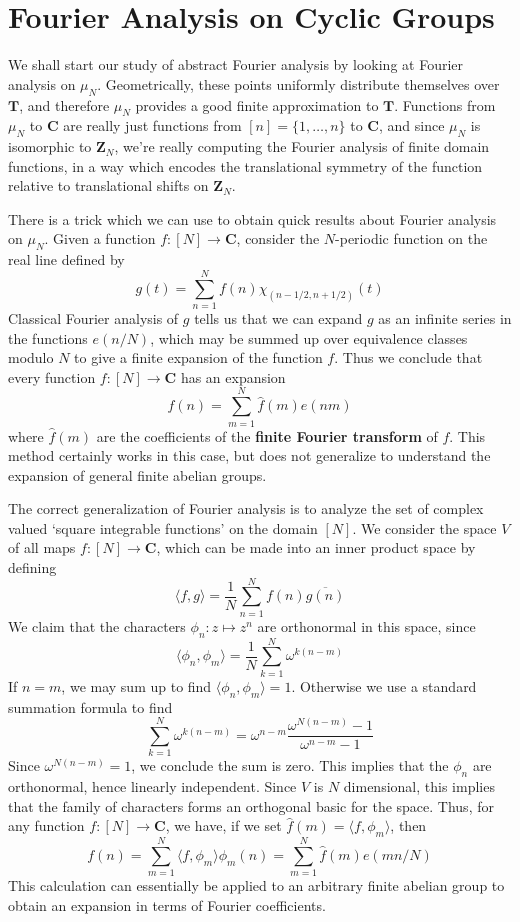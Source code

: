 \section{Fourier Analysis on Cyclic Groups}

We shall start our study of abstract Fourier analysis by looking at Fourier analysis on $\mu_N$. Geometrically, these points uniformly distribute themselves over $\mathbf{T}$, and therefore $\mu_N$ provides a good finite approximation to $\mathbf{T}$. Functions from $\mu_N$ to $\mathbf{C}$ are really just functions from $[n] = \{ 1, \dots, n \}$ to $\mathbf{C}$, and since $\mu_N$ is isomorphic to $\mathbf{Z}_N$, we're really computing the Fourier analysis of finite domain functions, in a way which encodes the translational symmetry of the function relative to translational shifts on $\mathbf{Z}_N$.

There is a trick which we can use to obtain quick results about Fourier analysis on $\mu_N$. Given a function $f: [N] \to \mathbf{C}$, consider the $N$-periodic function on the real line defined by
%
\[ g(t) = \sum_{n = 1}^N f(n) \chi_{(n-1/2,n+1/2)}(t) \]
%
Classical Fourier analysis of $g$ tells us that we can expand $g$ as an infinite series in the functions $e(n/N)$, which may be summed up over equivalence classes modulo $N$ to give a finite expansion of the function $f$. Thus we conclude that every function $f: [N] \to \mathbf{C}$ has an expansion
%
\[ f(n) = \sum_{m = 1}^N \widehat{f}(m) e(nm) \]
%
where $\widehat{f}(m)$ are the coefficients of the {\bf finite Fourier transform} of $f$. This method certainly works in this case, but does not generalize to understand the expansion of general finite abelian groups.

The correct generalization of Fourier analysis is to analyze the set of complex valued `square integrable functions' on the domain $[N]$. We consider the space $V$ of all maps $f: [N] \to \mathbf{C}$, which can be made into an inner product space by defining
%
\[ \langle f, g \rangle = \frac{1}{N} \sum_{n = 1}^N f(n) \overline{g(n)} \]
%
We claim that the characters $\phi_n: z \mapsto z^n$ are orthonormal in this space, since
%
\[ \langle \phi_n, \phi_m \rangle = \frac{1}{N} \sum_{k = 1}^N \omega^{k(n-m)} \]
%
If $n = m$, we may sum up to find $\langle \phi_n, \phi_m \rangle = 1$. Otherwise we use a standard summation formula to find
%
\[ \sum_{k = 1}^N \omega^{k(n-m)} = \omega^{n-m} \frac{\omega^{N(n-m)} - 1}{\omega^{n-m} -1} \]
%
Since $\omega^{N(n-m)} = 1$, we conclude the sum is zero. This implies that the $\phi_n$ are orthonormal, hence linearly independent. Since $V$ is $N$ dimensional, this implies that the family of characters forms an orthogonal basic for the space. Thus, for any function $f: [N] \to \mathbf{C}$, we have, if we set $\widehat{f}(m) = \langle f, \phi_m \rangle$, then
%
\[ f(n) = \sum_{m = 1}^N \langle f, \phi_m \rangle \phi_m(n) = \sum_{m = 1}^N \widehat{f}(m) e(mn/N) \]
%
This calculation can essentially be applied to an arbitrary finite abelian group to obtain an expansion in terms of Fourier coefficients.

